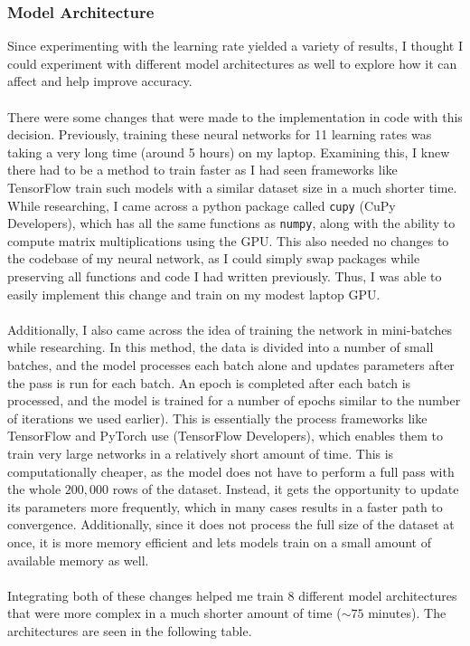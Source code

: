 \documentclass{article}
\begin{document}
\subsubsection{Model Architecture}
Since experimenting with the learning rate yielded a variety of results, I thought I could experiment with different model architectures as well to explore how it can affect and help improve accuracy. 
\\\\
There were some changes that were made to the implementation in code with this decision. Previously, training these neural networks for 11 learning rates was taking a very long time (around 5 hours) on my laptop. Examining this, I knew there had to be a method to train faster as I had seen frameworks like TensorFlow train such models with a similar dataset size in a much shorter time. While researching, I came across a python package called \verb|cupy| (CuPy Developers), which has all the same functions as \verb|numpy|, along with the ability to compute matrix multiplications using the GPU. This also needed no changes to the codebase of my neural network, as I could simply swap packages while preserving all functions and code I had written previously. Thus, I was able to easily implement this change and train on my modest laptop GPU.
\\\\
Additionally, I also came across the idea of training the network in mini-batches while researching. In this method, the data is divided into a number of small batches, and the model processes each batch alone and updates parameters after the pass is run for each batch. An epoch is completed after each batch is processed, and the model is trained for a number of epochs similar to the number of iterations we used earlier). This is essentially the process frameworks like TensorFlow and PyTorch use (TensorFlow Developers), which enables them to train very large networks in a relatively short amount of time. This is computationally cheaper, as the model does not have to perform a full pass with the whole $200,000$ rows of the dataset. Instead, it gets the opportunity to update its parameters more frequently, which in many cases results in a faster path to convergence. Additionally, since it does not process the full size of the dataset at once, it is more memory efficient and lets models train on a small amount of available memory as well.
\\\\
Integrating both of these changes helped me train 8 different model architectures that were more complex in a much shorter amount of time ($\sim 75$ minutes). The architectures are seen in the following table.
\end{document}
